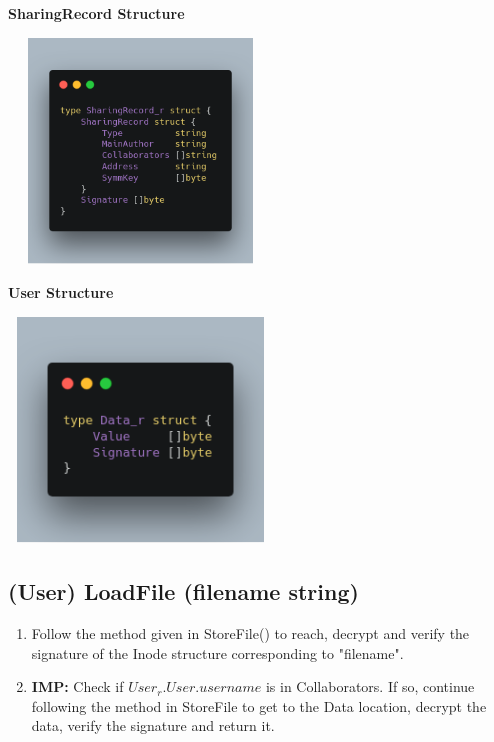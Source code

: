 \documentclass[a4paper, 12pt]{scrartcl}
\begin{document}
\begin{multicols}{2}

\begin{center}
	\textbf{SharingRecord Structure}
\end{center}

\begin{center}
	\includegraphics[width=7cm, height=6cm]{images/sharing.png}
\end{center}

\columnbreak

\begin{center}
	\textbf{User Structure}
\end{center}

\begin{center}
	\includegraphics[width=7cm, height=6cm]{images/data.png}
\end{center}

\end{multicols}

\subsection{(User) LoadFile (filename string)}
\begin{enumerate}
	\itemsep0em
	\item Follow the method given in StoreFile() to reach, decrypt and verify the signature of the Inode structure corresponding to "filename". 
	\item \textbf{IMP:} Check if $User_r.User.username$ is in Collaborators. If so, continue following the method in StoreFile to get to the Data location, decrypt the data, verify the signature and return it.
\end{enumerate}
\end{document}
